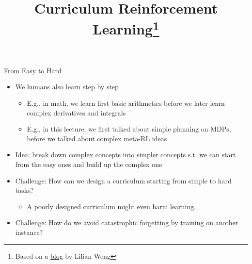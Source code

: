 


\title[Curriculum RL]{Curriculum Reinforcement Learning\footnote{Based on a \href{https://lilianweng.github.io/lil-log/2020/01/29/curriculum-for-reinforcement-learning.html}{blog} by Lilian Weng}}



	
	\maketitle

\begin{frame}[c]{From Easy to Hard}


\begin{itemize}
	\item We humans also learn step by step
	\begin{itemize}
		\item E.g., in math, we learn first basic arithmetics before we later learn complex derivatives and integrals
		\item E.g., in this lecture, we first talked about simple planning on MDPs, before we talked about complex meta-RL ideas
	\end{itemize}
	\smallskip
	\item \alert{Idea:} break down complex concepts into simpler concepts s.t. we can start from the easy ones and build up the complex one
	\item \alert{Challenge}: How can we design a curriculum starting from simple to hard tasks?
	\begin{itemize}
		\item A poorly designed curriculum might even harm learning.
	\end{itemize}
	\item \alert{Challenge}: How do we avoid catastrophic forgetting by training on another instance?
\end{itemize}


\end{frame}

